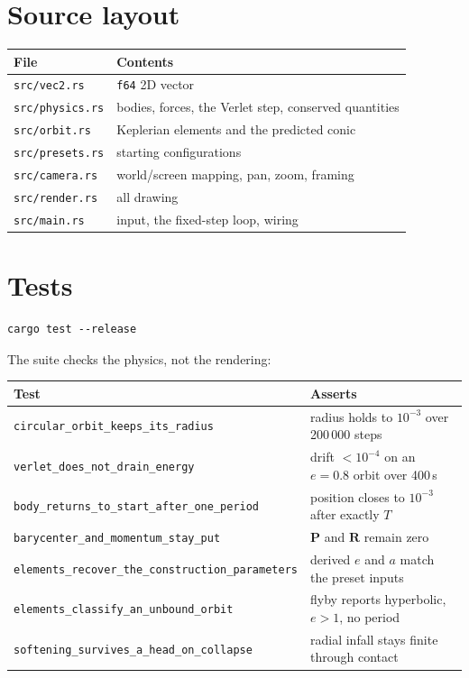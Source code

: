 \documentclass[11pt,a4paper]{article}
\newcommand{\vP}{\mathbf{P}}
\newcommand{\vR}{\mathbf{R}}
\begin{document}
\section{Source layout}

\begin{center}
\begin{tabular}{@{}ll@{}}
\toprule
\textbf{File} & \textbf{Contents}\\
\midrule
\texttt{src/vec2.rs}    & \texttt{f64} 2D vector\\
\texttt{src/physics.rs} & bodies, forces, the Verlet step, conserved quantities\\
\texttt{src/orbit.rs}   & Keplerian elements and the predicted conic\\
\texttt{src/presets.rs} & starting configurations\\
\texttt{src/camera.rs}  & world/screen mapping, pan, zoom, framing\\
\texttt{src/render.rs}  & all drawing\\
\texttt{src/main.rs}    & input, the fixed-step loop, wiring\\
\bottomrule
\end{tabular}
\end{center}

\section{Tests}

\begin{lstlisting}
cargo test --release
\end{lstlisting}

\noindent The suite checks the physics, not the rendering:

\begin{center}
\begin{tabular}{@{}ll@{}}
\toprule
\textbf{Test} & \textbf{Asserts}\\
\midrule
\texttt{circular\_orbit\_keeps\_its\_radius}
  & radius holds to $10^{-3}$ over 200\,000 steps\\
\texttt{verlet\_does\_not\_drain\_energy}
  & drift $< 10^{-4}$ on an $e=0.8$ orbit over 400\,s\\
\texttt{body\_returns\_to\_start\_after\_one\_period}
  & position closes to $10^{-3}$ after exactly $T$\\
\texttt{barycenter\_and\_momentum\_stay\_put}
  & $\vP$ and $\vR$ remain zero\\
\texttt{elements\_recover\_the\_construction\_parameters}
  & derived $e$ and $a$ match the preset inputs\\
\texttt{elements\_classify\_an\_unbound\_orbit}
  & flyby reports hyperbolic, $e>1$, no period\\
\texttt{softening\_survives\_a\_head\_on\_collapse}
  & radial infall stays finite through contact\\
\bottomrule
\end{tabular}
\end{center}
\end{document}
